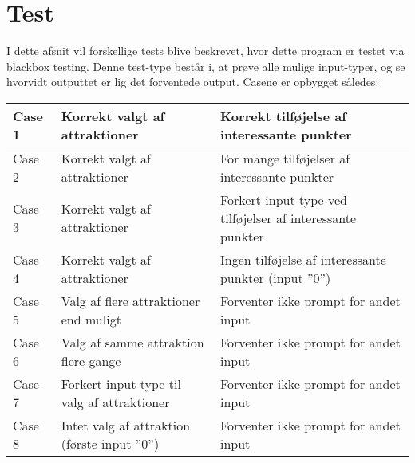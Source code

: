 \chapter{Test}
I dette afsnit vil forskellige tests blive beskrevet, hvor dette program er testet via blackbox testing. Denne test-type består i, at prøve alle mulige input-typer, og se hvorvidt outputtet er lig det forventede output.
Casene er opbygget således:\newline
\begin{tabular}{|l|l| p{5cm}|}
\hline
Case 1 & Korrekt valgt af attraktioner & Korrekt tilføjelse af interessante punkter \\ \hline
Case 2 & Korrekt valgt af attraktioner & For mange tilføjelser af interessante punkter \\ \hline
Case 3 & Korrekt valgt af attraktioner & Forkert input-type ved tilføjelser af interessante punkter\\ \hline
Case 4 & Korrekt valgt af attraktioner & Ingen tilføjelse af interessante punkter (input ”0”) \\ \hline
Case 5 & Valg af flere attraktioner end muligt & Forventer ikke prompt for andet input\\ \hline
Case 6 & Valg af samme attraktion flere gange &	Forventer ikke prompt for andet input\\ \hline
Case 7 & Forkert input-type til valg af attraktioner & Forventer ikke prompt for andet input\\ \hline
Case 8 & Intet valg af attraktion (første input ”0”) & Forventer ikke prompt for andet input\\ \hline
\end{tabular} 
\newline

